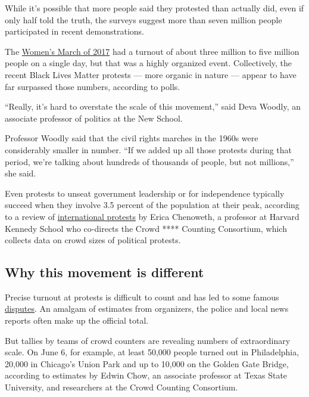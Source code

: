 While it's possible that more people said they protested than actually
did, even if only half told the truth, the surveys suggest more than
seven million people participated in recent demonstrations.

The
\href{https://www.nytimes3xbfgragh.onion/2017/01/21/us/womens-march.html}{Women's
March of 2017} had a turnout of about three million to five million
people on a single day, but that was a highly organized event.
Collectively, the recent Black Lives Matter protests --- more organic in
nature --- appear to have far surpassed those numbers, according to
polls.

``Really, it's hard to overstate the scale of this movement,'' said Deva
Woodly, an associate professor of politics at the New School.

Professor Woodly said that the civil rights marches in the 1960s were
considerably smaller in number. ``If we added up all those protests
during that period, we're talking about hundreds of thousands of people,
but not millions,'' she said.

Even protests to unseat government leadership or for independence
typically succeed when they involve 3.5 percent of the population at
their peak, according to a review of
\href{https://carrcenter.hks.harvard.edu/files/cchr/files/CCDP_005.pdf}{international
protests} by Erica Chenoweth, a professor at Harvard Kennedy School who
co-directs the Crowd **** Counting Consortium, which collects data on
crowd sizes of political protests.

\hypertarget{why-this-movement-is-different}{%
\subsection{Why this movement is
different}\label{why-this-movement-is-different}}

Precise turnout at protests is difficult to count and has led to some
famous
\href{https://www.nytimes3xbfgragh.onion/1995/10/21/us/federal-parks-chief-calls-million-man-count-low.html}{disputes}.
An amalgam of estimates from organizers, the police and local news
reports often make up the official total.

But tallies by teams of crowd counters are revealing numbers of
extraordinary scale. On June 6, for example, at least 50,000 people
turned out in Philadelphia, 20,000 in Chicago's Union Park and up to
10,000 on the Golden Gate Bridge, according to estimates by Edwin Chow,
an associate professor at Texas State University, and researchers at the
Crowd Counting Consortium.

